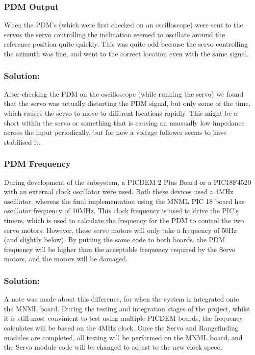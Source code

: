 \documentclass[]{article}
\begin{document}
\subsubsection{PDM Output}
When the PDM's (which were first checked on an oscilloscope) were sent to the servos the servo controlling the inclination seemed to oscillate around the reference position quite quickly. This was quite odd because the servo controlling the azimuth was fine, and went to the correct location even with the same signal.

\subsubsection{Solution:}
After checking the PDM on the oscilloscope (while running the servo) we found that the servo was actually distorting the PDM signal, but only some of the time, which causes the servo to move to different locations rapidly. This might be a short within the servo or something that is causing an unusually low impedance across the input periodically, but for now a voltage follower seems to have stabilised it.

\subsubsection{PDM Frequency}
During development of the subsystem, a PICDEM 2 Plus Board or a PIC18F4520 with an external clock oscillator were used. Both these devices used a 4MHz oscillator, whereas the final implementation using the MNML PIC 18 board has oscillator frequency of 10MHz. This clock frequency is used to drive the PIC's timers, which is used to calculate the frequency for the PDM to control the two servo motors. However, these servo motors will only take a frequency of 50Hz (and slightly below). By putting the same code to both boards, the PDM frequency will be higher than the acceptable frequency required by the Servo motors, and the motors will be damaged.

\subsubsection{Solution:}
A note was made about this difference, for when the system is integrated onto the MNML board. During the testing and integration stages of the project, whilst it is still most convinient to test using multiple PICDEM boards, the frequency calculates will be based on the 4MHz clock. Once the Servo and Rangefinding modules are completed, all testing will be performed on the MNML board, and the Servo module code will be changed to adjust to the new clock speed.   
\end{document}
